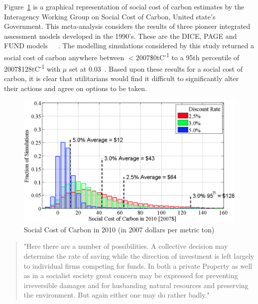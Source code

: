 \documentclass[11pt, oneside]{book}   	%
\begin{document}
Figure~\ref{USA SCC figure} is a graphical representation of social cost of carbon estimates by the Interagency Working Group on Social Cost of Carbon, United state's Government.
This meta-analysis considers the results of three pioneer integrated assessment models developed in the 1990's.
These are the DICE, PAGE and FUND models~\cite{wn1}~\cite{ch1}~\cite{rsjt1}.
The modelling simulations considered by this study returned a social cost of carbon anywhere between $<$2007\$0tC\textsuperscript{-1} to a 95th percentile of 2007\$128tC\textsuperscript{-1} with $\mu$ set at 0.03~\cite{iwg1}. Based upon these results for a social cost of carbon, it is clear that utilitarians would find it difficult to significantly alter their actions and agree on options to be taken. 

\begin{figure}[H]
\centering
\includegraphics[width=1\textwidth]{scc}
\caption{Social Cost of Carbon in 2010 (in 2007 dollars per metric ton)}
\label{USA SCC figure}
\end{figure}

\begin{quote}
"Here there are a number of possibilities. A collective decision may determine the rate of saving while the direction of investment is left largely to individual firms competing for funds. In both a private Property as well as in a socialist society great concern may be expressed for preventing irreversible damages and for husbanding natural resources and preserving the environment. But again either one may do rather badly."~\cite{jr1}
\end{quote}
\end{document}
